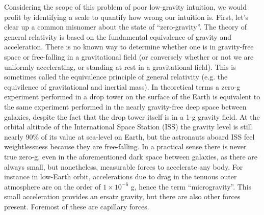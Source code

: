 \documentclass[12pt,a4paper,oneside]{book}
\begin{document}
Considering the scope of this problem of poor low-gravity intuition, we would profit by identifying a scale to quantify how wrong our intuition is. First, let's clear up a common misnomer about the state of ``zero-gravity''. The theory of general relativity is based on the fundamental equivalence of gravity and acceleration. There is no known way to determine whether one is in gravity-free space or free-falling in a gravitational field (or conversely whether or not we are uniformly accelerating, or standing at rest in a gravitational field). This is sometimes called the equivalence principle of general relativity (e.g. the equivilence of gravitational and inertial mass). In theoretical terms a zero-g experiment performed in a drop tower on the surface of the Earth is equivalent to the same experiment performed in the nearly gravity-free deep space between galaxies, despite the fact that the drop tower itself is in a 1-g gravity field. At the orbital altitude of the International Space Station (ISS) the gravity level is still nearly 90\% of its value at sea-level on Earth, but the astronauts aboard ISS feel weightlessness because they are free-falling. In a practical sense there is never true zero-g, even in the aforementioned dark space between galaxies, as there are always small, but nonetheless, measurable forces to accelerate any body. For instance in low-Earth orbit, accelerations due to drag in the tenuous outer atmosphere are on the order of $1 \times 10^{-6}$ g, hence the term ``microgravity''. This small acceleration provides an ersatz gravity, but there are also other forces present. Foremost of these are capillary forces. 
\end{document}
